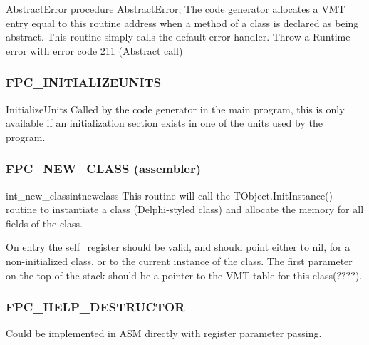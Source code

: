 \documentclass [a4paper,12pt]{article}
\begin{document}
\begin{function}{AbstractError}
\Declaration
procedure AbstractError;
\Description
The code generator allocates a VMT entry equal to this routine address when
a method of a class is declared as being abstract. This routine simply calls
the default error handler.
\Algorithm
Throw a Runtime error with error code 211 (Abstract call)
\end{function}

\subsubsection{FPC{\_}INITIALIZEUNITS}
\label{subsubsec:mylabel80}

\begin{function}{InitializeUnits}
\Declaration
\Description
Called by the code generator in the main program, this is only available if
an \textsf{initialization} section exists in one of the units used by the
program.
\end{function}

\subsubsection{FPC{\_}NEW{\_}CLASS (assembler)}
\label{subsubsec:mylabel81}

\begin{procedurel}{int{\_}new{\_}class}{intnewclass}
\Description
This routine will call the TObject.InitInstance() routine to
instantiate a class (Delphi-styled class) and allocate the memory for all
fields of the class.

On entry the self{\_}register should be valid, and should point either to
nil, for a non-initialized class, or to the current instance of the class.
The first parameter on the top of the stack should be a pointer to the VMT
table for this class(????).
\end{procedurel}

\subsubsection{FPC{\_}HELP{\_}DESTRUCTOR}
\label{subsubsec:mylabel82}

Could be implemented in ASM directly with register parameter passing.
\end{document}
